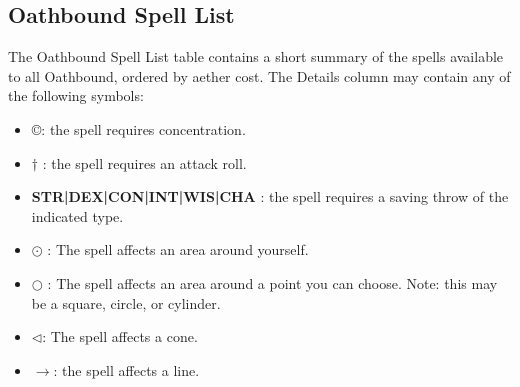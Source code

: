 \subsection{Oathbound Spell List}
The Oathbound Spell List table contains a short summary of the spells available to all Oathbound, ordered by aether cost. The Details column may contain any of the following symbols:
\begin{itemize}
	\item \copyright : the spell requires concentration.
	\item $\dagger$ : the spell requires an attack roll.
	\item \textbf{STR|DEX|CON|INT|WIS|CHA} : the spell requires a saving throw of the indicated type.
	\item $\odot$ : The spell affects an area around yourself.
	\item $\bigcirc$ : The spell affects an area around a point you can choose. Note: this may be a square, circle, or cylinder.
	\item $\triangleleft$: The spell affects a cone.
	\item $\rightarrow$: the spell affects a line.
\end{itemize}

